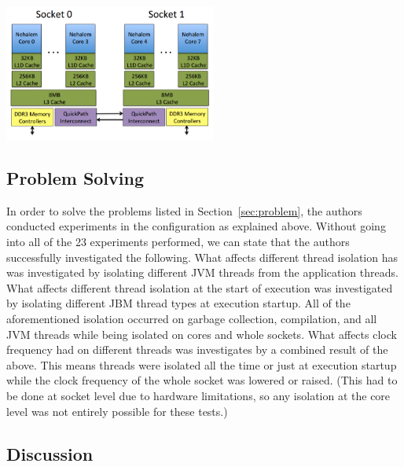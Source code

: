 \documentclass[conference]{IEEEtran}
\begin{document}
\begin{center}
\includegraphics[height=45mm]{images/hardware}
\end{center}

\subsection{Problem Solving}

In order to solve the problems listed in Section~\ref{sec:problem}, the authors
conducted experiments in the configuration as explained above. Without going into all of the 23
experiments performed, we can state that the authors successfully investigated the following.
What affects different thread isolation has was investigated by isolating different JVM threads
from the application threads. What affects different thread isolation at the start of execution
was investigated by isolating different JBM thread types at execution startup. All of the
aforementioned isolation occurred on garbage collection, compilation, and all JVM threads
while being isolated on cores and whole sockets. What affects clock frequency had on different
threads was investigates by a combined result of the above. This means threads were isolated all
the time or just at execution startup while the clock frequency of the whole socket was lowered
or raised. (This had to be done at socket level due to hardware limitations, so any isolation
at the core level was not entirely possible for these tests.) 

\subsection {Discussion}
\end{document}
